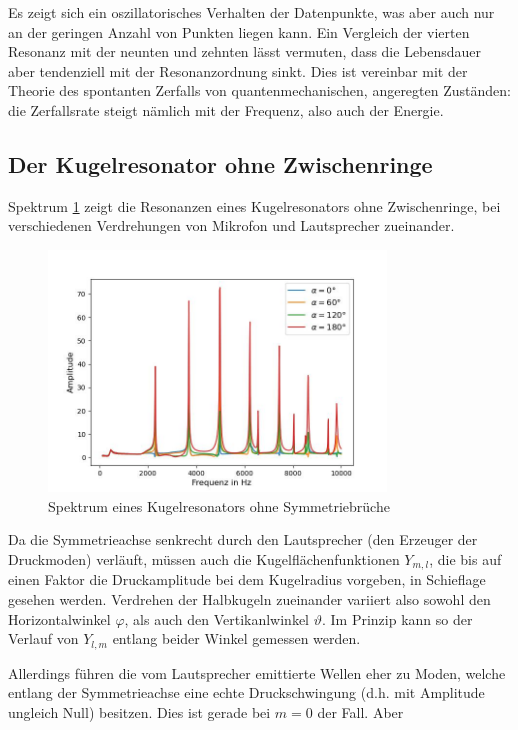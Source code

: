 \documentclass[../main.tex]{subfiles}
\begin{document}
    Es zeigt sich ein oszillatorisches Verhalten der Datenpunkte, was aber auch nur an der geringen Anzahl von Punkten liegen kann. Ein Vergleich der vierten Resonanz mit der neunten und zehnten lässt vermuten, dass die Lebensdauer aber tendenziell mit der Resonanzordnung sinkt. Dies ist vereinbar mit der Theorie des spontanten Zerfalls von quantenmechanischen, angeregten Zuständen: die Zerfallsrate steigt nämlich mit der Frequenz, also auch der Energie.

\subsection{Der Kugelresonator ohne Zwischenringe}     
    Spektrum \ref{fig:II_f_Spektren} zeigt die Resonanzen eines Kugelresonators ohne Zwischenringe, bei verschiedenen Verdrehungen von Mikrofon und Lautsprecher zueinander.
    
    \begin{figure}[H]
        \centering
        \includegraphics[width=0.8\textwidth]{Bilddateien/Auswertung/II_f_Spektren.jpg}
        \caption{Spektrum eines Kugelresonators ohne Symmetriebrüche}
        \label{fig:II_f_Spektren}
    \end{figure}

    Da die Symmetrieachse senkrecht durch den Lautsprecher (den Erzeuger der Druckmoden) verläuft, müssen auch die Kugelflächenfunktionen $Y_{m,l}$, die bis auf einen Faktor die Druckamplitude bei dem Kugelradius vorgeben, in Schieflage gesehen werden. Verdrehen der Halbkugeln zueinander variiert also sowohl den Horizontalwinkel $\varphi$, als auch den Vertikanlwinkel $\vartheta$. Im Prinzip kann so der Verlauf von $Y_{l,m}$ entlang beider Winkel gemessen werden.

    Allerdings führen die vom Lautsprecher emittierte Wellen eher zu Moden, welche entlang der Symmetrieachse eine echte Druckschwingung (d.h. mit Amplitude ungleich Null) besitzen. Dies ist gerade bei $m=0$ der Fall. Aber
\end{document}

